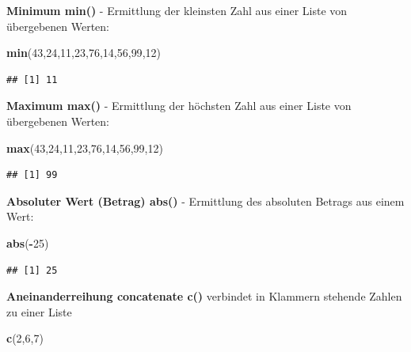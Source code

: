 \documentclass[]{book}
\newenvironment{Shaded}{\begin{snugshade}}{\end{snugshade}}
\newcommand{\KeywordTok}[1]{\textcolor[rgb]{0.13,0.29,0.53}{\textbf{#1}}}
\newcommand{\DecValTok}[1]{\textcolor[rgb]{0.00,0.00,0.81}{#1}}
\newcommand{\OperatorTok}[1]{\textcolor[rgb]{0.81,0.36,0.00}{\textbf{#1}}}
\newcommand{\NormalTok}[1]{#1}
\begin{document}
\textbf{Minimum min()} - Ermittlung der kleinsten Zahl aus einer Liste
von übergebenen Werten:

\begin{Shaded}
\begin{Highlighting}[]
\KeywordTok{min}\NormalTok{(}\DecValTok{43}\NormalTok{,}\DecValTok{24}\NormalTok{,}\DecValTok{11}\NormalTok{,}\DecValTok{23}\NormalTok{,}\DecValTok{76}\NormalTok{,}\DecValTok{14}\NormalTok{,}\DecValTok{56}\NormalTok{,}\DecValTok{99}\NormalTok{,}\DecValTok{12}\NormalTok{)}
\end{Highlighting}
\end{Shaded}

\begin{verbatim}
## [1] 11
\end{verbatim}

\textbf{Maximum max()} - Ermittlung der höchsten Zahl aus einer Liste
von übergebenen Werten:

\begin{Shaded}
\begin{Highlighting}[]
\KeywordTok{max}\NormalTok{(}\DecValTok{43}\NormalTok{,}\DecValTok{24}\NormalTok{,}\DecValTok{11}\NormalTok{,}\DecValTok{23}\NormalTok{,}\DecValTok{76}\NormalTok{,}\DecValTok{14}\NormalTok{,}\DecValTok{56}\NormalTok{,}\DecValTok{99}\NormalTok{,}\DecValTok{12}\NormalTok{)}
\end{Highlighting}
\end{Shaded}

\begin{verbatim}
## [1] 99
\end{verbatim}

\textbf{Absoluter Wert (Betrag) abs()} - Ermittlung des absoluten
Betrags aus einem Wert:

\begin{Shaded}
\begin{Highlighting}[]
\KeywordTok{abs}\NormalTok{(}\OperatorTok{-}\DecValTok{25}\NormalTok{)}
\end{Highlighting}
\end{Shaded}

\begin{verbatim}
## [1] 25
\end{verbatim}

\textbf{Aneinanderreihung concatenate c()} verbindet in Klammern
stehende Zahlen zu einer Liste

\begin{Shaded}
\begin{Highlighting}[]
\KeywordTok{c}\NormalTok{(}\DecValTok{2}\NormalTok{,}\DecValTok{6}\NormalTok{,}\DecValTok{7}\NormalTok{)}
\end{Highlighting}
\end{Shaded}
\end{document}
